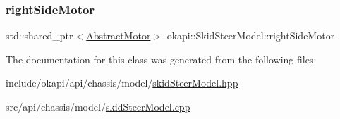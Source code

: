 \subsubsection{\texorpdfstring{rightSideMotor}{rightSideMotor}}
{\footnotesize\ttfamily std\+::shared\+\_\+ptr$<$\mbox{\hyperlink{classokapi_1_1AbstractMotor}{Abstract\+Motor}}$>$ okapi\+::\+Skid\+Steer\+Model\+::right\+Side\+Motor\hspace{0.3cm}{\ttfamily [protected]}}



The documentation for this class was generated from the following files\+:\begin{DoxyCompactItemize}
\item 
include/okapi/api/chassis/model/\mbox{\hyperlink{skidSteerModel_8hpp}{skid\+Steer\+Model.\+hpp}}\item 
src/api/chassis/model/\mbox{\hyperlink{skidSteerModel_8cpp}{skid\+Steer\+Model.\+cpp}}\end{DoxyCompactItemize}
